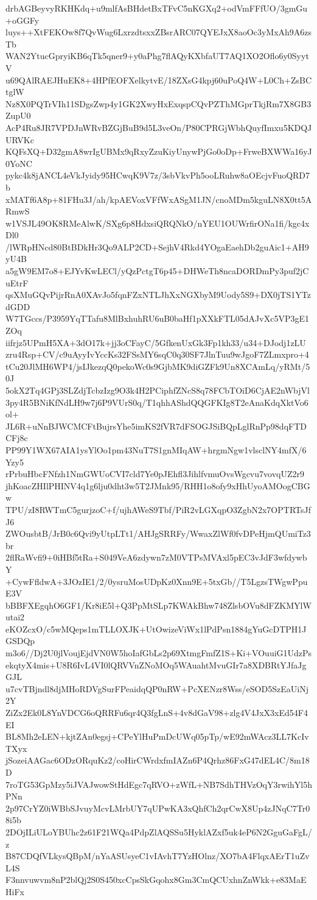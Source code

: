 drbAGBeyvyRKHKdq+u9mlfAsBHdetBxTFvC5nKGXq2+odVmFFfUO/3gmGu+oGGFy
luys++XtFEKOw8f7QvWug6LxrzdtsxxZBsrARC07QYEJxX8aoOc3yMxAh9A6zsTb
WAN2YtucGpryiKB6qTk5qner9+y0aPhg7flAQyKXbfaUT7AQ1XO2Oflo6y0SyytV
u69QAlRAEJHuEK8+4HPfEOFXelkytvE/18ZXsG4kpj60uPoQ4W+L0Ch+ZsBCtglW
Nz8X0PQTrVIh11SDgsZwp4y1GK2XwyHxExqspCQvPZThMGprTkjRm7X8GB3ZupU0
AcP4Ru8JR7VPDJnWRvBZGjBuB9d5L3veOn/P80CPRGjWbhQuyfImxu5KDQJURVKc
KQFsXQ+D32gmA8wrIgUBMx9qRxyZzuKiyUnywPjGo0oDp+FrweBXWWa16yJ0YoNC
pykc4k8jANCL4eVkJyidy95HCwqK9V7z/3sbVkvPh5ooLRuhw8aOEcjvFuoQRD7b
xMATf6A8p+81FHu3J/ah/kpAEVoxVFfWxASgM1JN/cnoMDm5kguLN8X0tt5ARmwS
w1VSJL49OK8RMeAlwK/SXg6p8HdxsiQRQNkO/nYEU1OUWrfirONa1fi/kgc4xDl0
/lWRpHNcd80BtBDkHr3Qo9ALP2CD+SejhV4Rkd4YOgaEaehDb2guAic1+AH9yU4B
a5gW9EM7o8+EJYvKwLECl/yQzPctgT6p45+DHWeTh8ncaDORDmPy3puf2jCuEtrF
qsXMuGQvPijrRnA0XAvJo5fqnFZxNTLJhXxNGXbyM9Uody5S9+DX0jTS1YTzdGDD
W7TGccs/P3959YqTTafu8MlBxhuhRU6uB0baHf1pXXkFTL05dAJvXc5VP3gE1ZOq
iifrjz5UPmH5XA+3dO17k+jj3oCFayC/5GfkenUxGk3Fp1kh33/u34+DJodj1zLU
zru4Rsp+CV/c9uAyyIvYccKs32FSsMY6sqC0q30SF7JlnTuu9wJgoF7ZLmxpro+4
tCu20JlMH6WP4/jsIJkezqQ0pekoWc0s9GjbMK9diGZFk9Un8XCAmLq/yRMt/50J
5okX2Tq4GPj3SLZdjTcbzIzg9O3k4H2PCiphfZNcS8q78FCbTOiD6CjAE2nWbjVl
3py4R5BNiKfNdLH9w7j6P9VUrS0q/T1qhhAShdQQGFKIg8T2eAnaKdqXktVo6ol+
JL6R+uNnBJWCMCFtBujrsYhe5imKS2fVR7dFSOGJSiBQpLglRnPp98dqFTDCFj8c
PP99Y1WX67AIA1ysYlOo1pm43NuT7S1gnMIqAW+hrgmNgw1vlsclNY4mfX/6Yzy5
rPrbuHbcFNfzh1NmGWUoCVI7cld7Ye0pJEhfl3JihlfvmuOvsWgcvu7vovqUZ2r9
jhKoacZHIlPHINV4q1g6lju0dht3w5T2JMnk95/RHH1o8ofy9xHhUyoAMOogCBGw
TPU/zI8RWTmC5gurjzoC+f/ujhAWeS9Tbf/PiR2vLGXqpO3ZgbN2x7OPTRTsJfJ6
ZWOusbtB/JrB0c6Qvi9yUtpLTt1/AHJgSRRFy/WwaxZlWf0fvDPeHjmQUmiTz3br
2flRaWvfi9+0iHBf5tRa+S049VeA6zdywn7zM0VTPsMVAxl5pEC3vJdF3wfdywbY
+CywFfldwA+3JOzIE1/2/0ysruMosUDpKz0Xnn9E+5txGb//T5LgzsTWgwPpuE3V
bBBFXEgqhO6GF1/Kr8iE5l+Q3PpMtSLp7KWAkBhw748ZlsbOVu8dFZKMYlWutai2
eKOZcxO/c5wMQeps1mTLLOXJK+UtOwizeViWx1lPdPsn1884gYuGcDTPH1JGSDQp
m3o6//Dj2U0jlVoujEjdVN0W5hoIafGbLs2p69XtmgFmfZ1S+Ki+VOuuiG1UdzPs
ekqtyX4mis+U8R6IvL4VI0lQRVVnZNoMOq5WAuahtMvuGIr7a8XDBRtYJfaJgGJL
u7cvTBjndl8djMHoRDVgSurFPeaidqQP0nRW+PcXENzr8Wss/eSOD5SzEaUiNj2Y
ZiZx2Ek0L8YnVDCG6oQRRFu6qr4Q3fgLnS+4v8dGaV98+zlg4V4JxX3xEd54F4EI
BL8Mh2eLEN+kjtZAn0egsj+CPeYlHuPmDcUWq05pTp/wE92mWAcz3LL7KcIvTXyx
jSozeiAAGac6ODzORquKz2/coHirCWrdxfmIAZn6P4Qrhz86FxG47dEL4C/8m18D
7roTG53GpMzy5iJVAJwowStHdEgc7qRVO+zWfL+NB7SdhTHVzOqY3rwihYl5hPNn
2p97CrYZ0iWBbSJvuyMcvLMrbUY7qUPwKA3xQhfCh2qrCwX8Up4zJNqC7Tr08i5b
2DOjILiULoYBUhc2z61F21WQa4PdpZlAQSSu5HyklAZxf5uk4eP6N2GguGaFgL/z
B87CDQfVLkysQBpM/nYaASUsyeC1vIAvhT7YzHOlnz/XO7bA4FlqxAErT1uZvL4S
F3nnvuwvm8nP2blQj2S0S450xcCpsSkGqohx8Gm3CmQCUxhnZnWkk+e83MaEHiFx

